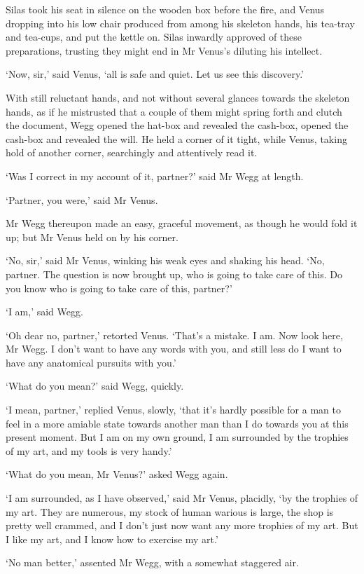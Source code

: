 Silas took his seat in silence on the wooden box before the fire, and
Venus dropping into his low chair produced from among his skeleton
hands, his tea-tray and tea-cups, and put the kettle on. Silas inwardly
approved of these preparations, trusting they might end in Mr Venus’s
diluting his intellect.

‘Now, sir,’ said Venus, ‘all is safe and quiet. Let us see this
discovery.’

With still reluctant hands, and not without several glances towards the
skeleton hands, as if he mistrusted that a couple of them might spring
forth and clutch the document, Wegg opened the hat-box and revealed the
cash-box, opened the cash-box and revealed the will. He held a corner
of it tight, while Venus, taking hold of another corner, searchingly and
attentively read it.

‘Was I correct in my account of it, partner?’ said Mr Wegg at length.

‘Partner, you were,’ said Mr Venus.

Mr Wegg thereupon made an easy, graceful movement, as though he would
fold it up; but Mr Venus held on by his corner.

‘No, sir,’ said Mr Venus, winking his weak eyes and shaking his head.
‘No, partner. The question is now brought up, who is going to take care
of this. Do you know who is going to take care of this, partner?’

‘I am,’ said Wegg.

‘Oh dear no, partner,’ retorted Venus. ‘That’s a mistake. I am. Now look
here, Mr Wegg. I don’t want to have any words with you, and still less
do I want to have any anatomical pursuits with you.’

‘What do you mean?’ said Wegg, quickly.

‘I mean, partner,’ replied Venus, slowly, ‘that it’s hardly possible
for a man to feel in a more amiable state towards another man than I
do towards you at this present moment. But I am on my own ground, I am
surrounded by the trophies of my art, and my tools is very handy.’

‘What do you mean, Mr Venus?’ asked Wegg again.

‘I am surrounded, as I have observed,’ said Mr Venus, placidly, ‘by
the trophies of my art. They are numerous, my stock of human warious is
large, the shop is pretty well crammed, and I don’t just now want any
more trophies of my art. But I like my art, and I know how to exercise
my art.’

‘No man better,’ assented Mr Wegg, with a somewhat staggered air.

